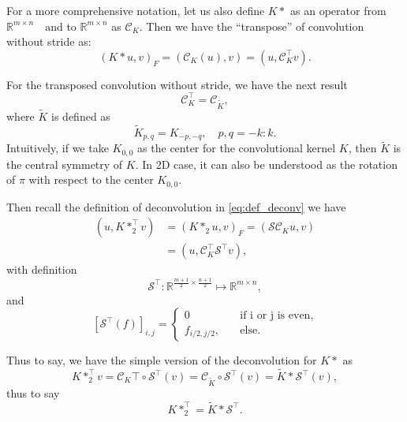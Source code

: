 For a more comprehensive notation, let us also define 
$K\ast$ as an operator from $\mathbb{R}^{m\times n} \quad \text{and}$
to $\mathbb{R}^{m\times n}$ as $\mathcal C_K$.
Then we have the ``transpose'' of convolution without stride as:
\begin{equation}\label{eq:def_tran_conv}
(K \ast u, v)_F = (\mathcal C_K (u), v) =  (u,  \mathcal C_K^\top v).
\end{equation}

\begin{lemma}\label{lemm:tilde-K}
For the transposed convolution without stride, we have the next result
\begin{equation}\label{eq:}
\mathcal C_K^\top = \mathcal C_{\tilde K},
\end{equation}
where $\tilde K$ is defined as
\begin{equation}\label{eq:def_tildeK}
\tilde K_{p,q} = K_{-p, -q}, \quad p,q = -k:k.
\end{equation}
Intuitively, if we take $K_{0,0}$ as the center for the convolutional kernel $K$, 
then $\tilde K$ is the central symmetry of $K$. 
In 2D case, it can also be understood as the rotation of $\pi$ with respect to
the center $K_{0,0}$.
\end{lemma}

Then recall the definition of deconvolution in \eqref{eq:def_deconv} we have
\begin{equation}\label{eq:op_deconv}
\begin{aligned}
(u,  K \ast_2^\top v) &= (K \ast_2 u, v)_F = (\mathcal S \mathcal C_K u, v) \\
&= (u,  \mathcal C^\top_K \mathcal S^\top v),
\end{aligned}
\end{equation}
with definition
\begin{equation}\label{eq:de_stride_dim}
\mathcal S^\top:   \mathbb{R}^{\frac{m+1}{2} \times\frac{n+1}{2}} \mapsto \mathbb{R}^{m\times n},
\end{equation}
and 
\begin{equation}\label{eq:de_stride}
[\mathcal S^\top (f)]_{i,j} = 
\begin{cases}
0 \quad &\text{if i or j is even}, \\
f_{i/2, j/2}, \quad &\text{else}.
\end{cases}
\end{equation}

Thus to say, we have the simple version of the deconvolution for $K \ast $ as
\begin{equation}\label{eq:simple_deconv}
K \ast_2^\top v = \mathcal C_K\top \circ \mathcal S^\top (v) = \mathcal C_{\tilde K} \circ \mathcal S^\top (v) = \tilde K \ast \mathcal S^\top (v),
\end{equation}
thus to say
\begin{equation}\label{eq:final}
K \ast_2^\top  = \tilde K \ast \mathcal S^\top.
\end{equation}

